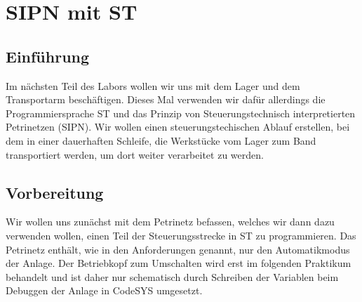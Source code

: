\documentclass{report}
\begin{document}
\newpage

\tableofcontents

\listoffigures

\newpage

\chapter{SIPN mit ST}

\section{Einführung}
\label{sec:einfuhrung}

Im nächsten Teil des Labors wollen wir uns mit dem Lager und dem Transportarm beschäftigen. Dieses Mal verwenden wir dafür allerdings die Programmiersprache ST und das Prinzip von Steuerungstechnisch interpretierten Petrinetzen (SIPN). Wir wollen einen steuerungstechischen Ablauf erstellen, bei dem in einer dauerhaften Schleife, die Werkstücke vom Lager zum Band transportiert werden, um dort weiter verarbeitet zu werden.

\section{Vorbereitung}

Wir wollen uns zunächst mit dem Petrinetz befassen, welches wir dann dazu verwenden wollen, einen Teil der Steuerungsstrecke in ST zu programmieren. Das Petrinetz enthält, wie in den Anforderungen genannt, nur den Automatikmodus der Anlage. Der Betriebkopf zum Umschalten wird erst im folgenden Praktikum behandelt und ist daher nur schematisch durch Schreiben der Variablen beim Debuggen der Anlage in CodeSYS umgesetzt.
\end{document}

